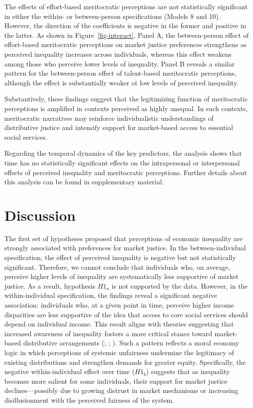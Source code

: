 \documentclass[
  12pt,
]{article}
\begin{document}
The effects of effort-based meritocratic perceptions are not
statistically significant in either the within- or between-person
specifications (Models 8 and 10). However, the direction of the
coefficients is negative in the former and positive in the latter. As
shown in Figure~\ref{fig-interact}, Panel A, the between-person effect
of effort-based meritocratic perceptions on market justice preferences
strengthens as perceived inequality increases across individuals,
whereas this effect weakens among those who perceive lower levels of
inequality. Panel B reveals a similar pattern for the between-person
effect of talent-based meritocratic perceptions, although the effect is
substantially weaker at low levels of perceived inequality.

Substantively, these findings suggest that the legitimizing function of
meritocratic perceptions is amplified in contexts perceived as highly
unequal. In such contexts, meritocratic narratives may reinforce
individualistic understandings of distributive justice and intensify
support for market-based access to essential social services.

Regarding the temporal dynamics of the key predictors, the analysis
shows that time has no statistically significant effects on the
intrapersonal or interpersonal effects of perceived inequality and
meritocratic perceptions. Further details about this analysis can be
found in supplementary material.

\section{Discussion}\label{discussion}

The first set of hypotheses proposed that perceptions of economic
inequality are strongly associated with preferences for market justice.
In the between-individual specification, the effect of perceived
inequality is negative but not statistically significant. Therefore, we
cannot conclude that individuals who, on average, perceive higher levels
of inequality are systematically less supportive of market justice. As a
result, hypothesis \(H1_{a}\) is not supported by the data. However, in
the within-individual specification, the findings reveal a significant
negative association: individuals who, at a given point in time,
perceive higher income disparities are less supportive of the idea that
access to core social services should depend on individual income. This
result aligns with theories suggesting that increased awareness of
inequality fosters a more critical stance toward market-based
distributive arrangements
(;
;
). Such a pattern reflects a
moral economy logic in which perceptions of systemic unfairness
undermine the legitimacy of existing distributions and strengthen
demands for greater equity. Specifically, the negative within-individual
effect over time (\(H1_{b}\)) suggests that as inequality becomes more
salient for some individuals, their support for market justice
declines---possibly due to growing distrust in market mechanisms or
increasing disillusionment with the perceived fairness of the system.
\end{document}
